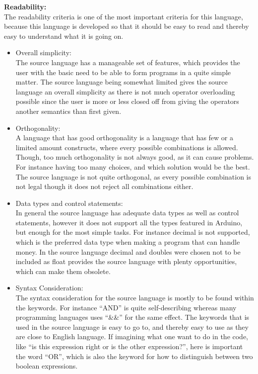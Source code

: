 \textbf{Readability:} \\
The readability criteria is one of the most important criteria for this language, because this language is developed so that it should be easy to read and thereby easy to understand what it is going on. \\
\begin{itemize}
\item Overall simplicity:\\
The source language has a manageable set of features, which provides the user with the basic need to be able to form programs in a quite simple matter. The source language being somewhat limited gives the source language an overall simplicity as there is not much operator overloading possible since the user is more or less closed off from giving the operators another semantics than first given. 
\item Orthogonality:\\
A language that has good orthogonality is a language that has few or a limited amount constructs, where every possible combinations is allowed. Though, too much orthogonality is not always good, as it can cause problems. For instance having too many choices, and which solution would be the best.\\
The source language is not quite orthogonal, as every possible combination is not legal though it does not reject all combinations either.  
\item Data types and control statements:\\
In general the source language has adequate data types as well as control statements, however it does not support all the types featured in Arduino, but enough for the most simple tasks. For instance decimal is not supported, which is the preferred data type when making a program that can handle money. In the source language decimal and doubles were chosen not to be included as float provides the source language with plenty opportunities, which can make them obsolete.
\item Syntax Consideration:\\
The syntax consideration for the source language is mostly to be found within the keywords. For instance ``AND'' is quite self-describing whereas many programming languages uses ``\&\&'' for the same effect. The keywords that is used in the source language is easy to go to, and thereby easy to use as they are close to English language. If imagining what one want to do in the code, like ``is this expression right or is the other expression?'', here is important the word ``OR'', which is also the keyword for how to distinguish between two boolean expressions.\\ 
\end{itemize}
